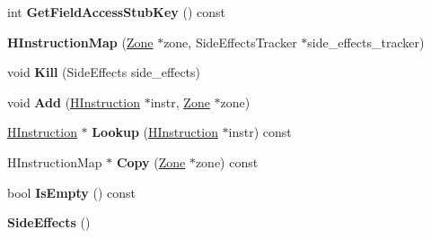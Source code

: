 \begin{DoxyCompactItemize}
\item 
\hypertarget{classv8_1_1internal_1_1_v8___f_i_n_a_l_a033d1053510f1f328b8807009c5ba2df}{}int {\bfseries Get\+Field\+Access\+Stub\+Key} () const \label{classv8_1_1internal_1_1_v8___f_i_n_a_l_a033d1053510f1f328b8807009c5ba2df}

\item 
\hypertarget{classv8_1_1internal_1_1_v8___f_i_n_a_l_ab6d7b5d276c82166731bf1891b6c6cdc}{}{\bfseries H\+Instruction\+Map} (\hyperlink{classv8_1_1internal_1_1_zone}{Zone} $\ast$zone, Side\+Effects\+Tracker $\ast$side\+\_\+effects\+\_\+tracker)\label{classv8_1_1internal_1_1_v8___f_i_n_a_l_ab6d7b5d276c82166731bf1891b6c6cdc}

\item 
\hypertarget{classv8_1_1internal_1_1_v8___f_i_n_a_l_a1f9b72e62208e478c8d0ec1226bee99b}{}void {\bfseries Kill} (Side\+Effects side\+\_\+effects)\label{classv8_1_1internal_1_1_v8___f_i_n_a_l_a1f9b72e62208e478c8d0ec1226bee99b}

\item 
\hypertarget{classv8_1_1internal_1_1_v8___f_i_n_a_l_a5ea32a82bdf749fae161ea661bafc980}{}void {\bfseries Add} (\hyperlink{classv8_1_1internal_1_1_h_instruction}{H\+Instruction} $\ast$instr, \hyperlink{classv8_1_1internal_1_1_zone}{Zone} $\ast$zone)\label{classv8_1_1internal_1_1_v8___f_i_n_a_l_a5ea32a82bdf749fae161ea661bafc980}

\item 
\hypertarget{classv8_1_1internal_1_1_v8___f_i_n_a_l_aedd3d5ace8174aca9f45b9a7ce3ef7e7}{}\hyperlink{classv8_1_1internal_1_1_h_instruction}{H\+Instruction} $\ast$ {\bfseries Lookup} (\hyperlink{classv8_1_1internal_1_1_h_instruction}{H\+Instruction} $\ast$instr) const \label{classv8_1_1internal_1_1_v8___f_i_n_a_l_aedd3d5ace8174aca9f45b9a7ce3ef7e7}

\item 
\hypertarget{classv8_1_1internal_1_1_v8___f_i_n_a_l_a5fbba76fc5a14555939be44981d59c0c}{}H\+Instruction\+Map $\ast$ {\bfseries Copy} (\hyperlink{classv8_1_1internal_1_1_zone}{Zone} $\ast$zone) const \label{classv8_1_1internal_1_1_v8___f_i_n_a_l_a5fbba76fc5a14555939be44981d59c0c}

\item 
\hypertarget{classv8_1_1internal_1_1_v8___f_i_n_a_l_a545a7ac3ec92a772b5595779966d5253}{}bool {\bfseries Is\+Empty} () const \label{classv8_1_1internal_1_1_v8___f_i_n_a_l_a545a7ac3ec92a772b5595779966d5253}

\item 
\hypertarget{classv8_1_1internal_1_1_v8___f_i_n_a_l_aa19916e7f60765f3af888a06e2411804}{}{\bfseries Side\+Effects} ()\label{classv8_1_1internal_1_1_v8___f_i_n_a_l_aa19916e7f60765f3af888a06e2411804}


\end{DoxyCompactItemize}
